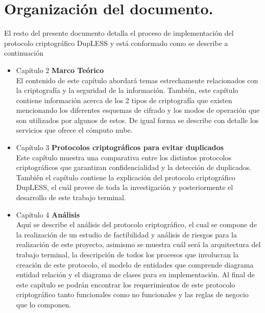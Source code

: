 \section{Organización del documento. }
El resto del presente documento detalla el proceso de implementaci\'on del protocolo criptogr\'afico DupLESS y est\'a conformado como se describe a continuaci\'on
\begin{itemize}
\item Capítulo 2 \textbf{Marco Teórico} \\
El contenido de este capítulo abordará temas estrechamente relacionados con la criptografía y la seguridad de la información. También, este capítulo contiene información acerca de los 2 tipos de criptografía que existen mencionando los diferentes esquemas de cifrado y los modos de operación que son utilizados por algunos de estos. De igual forma se describe con detalle los servicios que ofrece el cómputo nube. 

\item Capítulo 3 \textbf{Protocolos criptográficos para evitar duplicados} \\
Este cap\'itulo muestra una comparativa entre los distintos protocolos criptogr\'aficos que garantizan confidencialidad y la detecci\'on de duplicados. También el capítulo contiene la explicación del protocolo criptográfico DupLESS, el cuál provee de toda la investigación y posteriormente el desarrollo de este trabajo terminal.

\item Capítulo 4 \textbf{Análisis} \\
Aqu\'i se describe el análisis del protocolo criptográfico, el cual se compone de la realización de un estudio de factibilidad y análisis de riesgos para la realización de este proyecto, asimismo se muestra cuál será la arquitectura del trabajo terminal, la descripción de todos los procesos que involucran la creación de este protocolo, el modelo de entidades que comprende diagrama entidad relación y el diagrama de clases para su implementación. Al final de este capítulo se podrán encontrar los requerimientos de este protocolo criptográfico tanto funcionales como no funcionales y las reglas de negocio que lo componen.


\end{itemize}
